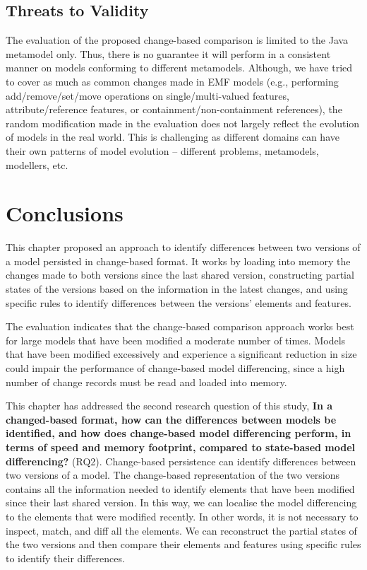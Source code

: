 \subsection{Threats to Validity}
\label{sec:threats_to_validity_7}
The evaluation of the proposed change-based comparison is limited to the Java metamodel only. Thus, there is no guarantee it will perform in a consistent manner on models conforming to different metamodels. Although, we have tried to cover as much as common changes made in EMF models (e.g., performing \textsf{add}/\textsf{remove}/\textsf{set}/\textsf{move} operations on \textsf{single}/\textsf{multi}-\textsf{valued} features, \textsf{attribute}/\textsf{reference} features, or \textsf{containment}/\textsf{non}-\textsf{containment} references), the random modification made in the evaluation does not largely reflect the evolution of models in the real world. This is challenging as different domains can have their own patterns of model evolution -- different problems, metamodels, modellers, etc.

\section{Conclusions}
\label{sec:conclusions_6}
This chapter proposed an approach to identify differences between two versions of a model persisted in change-based format. It works by loading into memory the changes made to both versions since the last shared version, constructing partial states of the versions based on the information in the latest changes, and using specific rules to identify differences between the versions’ elements and features.

The evaluation indicates that the change-based comparison approach works best for large models that have been modified a moderate number of times. Models that have been modified excessively and experience a significant reduction in size could impair the performance of change-based model differencing, since a high number of change records must be read and loaded into memory.

This chapter has addressed the second research question of this study, \textbf{In a changed-based format, how can the differences between models be identified, and how does change-based model differencing perform, in terms of speed and memory footprint, compared to state-based model differencing?} (RQ2). Change-based persistence can identify differences between two versions of a model. The change-based representation of the two versions contains all the information needed to identify elements that have been modified since their last shared version. In this way, we can localise the model differencing to the elements that were modified recently. In other words, it is not necessary to inspect, match, and diff all the elements. We can reconstruct the partial states of the two versions and then compare their elements and features using specific rules to identify their differences.

